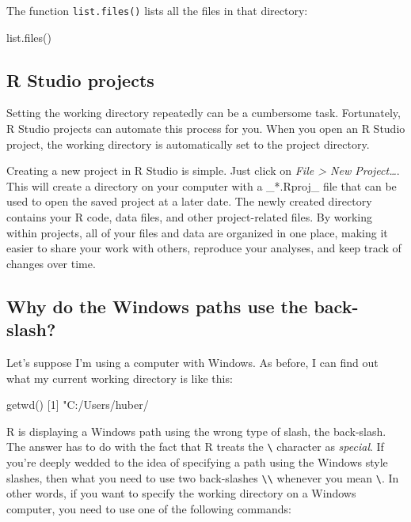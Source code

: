 \documentclass[
  12pt,
  oneside]{book}
\newenvironment{Shaded}{\begin{snugshade}}{\end{snugshade}}
\newcommand{\DecValTok}[1]{\textcolor[rgb]{0.00,0.00,0.81}{#1}}
\newcommand{\FunctionTok}[1]{\textcolor[rgb]{0.00,0.00,0.00}{#1}}
\newcommand{\NormalTok}[1]{#1}
\newcommand{\StringTok}[1]{\textcolor[rgb]{0.31,0.60,0.02}{#1}}
\theoremstyle{definition}
\theoremstyle{definition}
\theoremstyle{definition}
\theoremstyle{definition}
\theoremstyle{remark}
\begin{document}
The function \texttt{list.files()} lists all the files in that directory:

\begin{Shaded}
\begin{Highlighting}[]
\FunctionTok{list.files}\NormalTok{()}
\end{Highlighting}
\end{Shaded}

\hypertarget{sec:rstudioprojects}{%
\subsection{R Studio projects}\label{sec:rstudioprojects}}

Setting the working directory repeatedly can be a cumbersome task. Fortunately, R Studio projects can automate this process for you. When you open an R Studio project, the working directory is automatically set to the project directory.

Creating a new project in R Studio is simple. Just click on \emph{File \textgreater{} New Project\ldots{}}. This will create a directory on your computer with a \_*.Rproj\_ file that can be used to open the saved project at a later date. The newly created directory contains your R code, data files, and other project-related files. By working within projects, all of your files and data are organized in one place, making it easier to share your work with others, reproduce your analyses, and keep track of changes over time.

\hypertarget{sec:winbackslash}{%
\subsection{Why do the Windows paths use the back-slash?}\label{sec:winbackslash}}

Let's suppose I'm using a computer with Windows. As before, I can find out what my current working directory is like this:

\begin{Shaded}
\begin{Highlighting}[]
\FunctionTok{getwd}\NormalTok{()}
\NormalTok{[}\DecValTok{1}\NormalTok{] }\StringTok{"C:/Users/huber/}
\end{Highlighting}
\end{Shaded}

R is displaying a Windows path using the wrong type of slash, the back-slash. The answer has to do with the fact that R treats the \texttt{\textbackslash{}} character as \emph{special}. If you're deeply wedded to the idea of specifying a path using the Windows style slashes, then what you need to use two back-slashes \texttt{\textbackslash{}\textbackslash{}} whenever you mean \texttt{\textbackslash{}}. In other words, if you want to specify the working directory on a Windows computer, you need to use one of the following commands:
\end{document}
